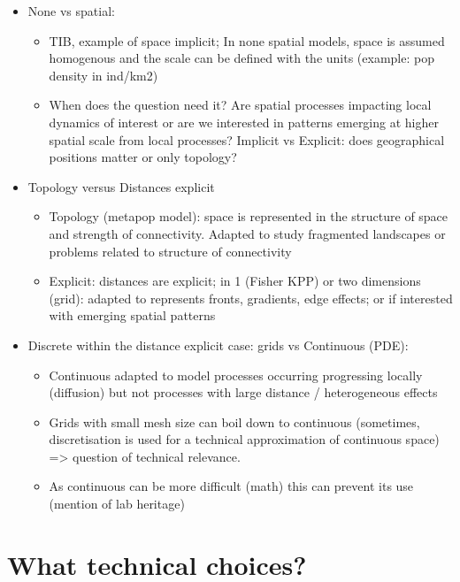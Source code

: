 \documentclass[
]{book}
\providecommand{\tightlist}{%
  \setlength{\itemsep}{0pt}\setlength{\parskip}{0pt}}
\theoremstyle{definition}
\theoremstyle{definition}
\theoremstyle{definition}
\theoremstyle{definition}
\theoremstyle{remark}
\begin{document}
\begin{itemize}
\tightlist
\item
  None vs spatial:

  \begin{itemize}
  \tightlist
  \item
    TIB, example of space implicit; In none spatial models, space is assumed homogenous and the scale can be defined with the units (example: pop density in ind/km2)
  \item
    When does the question need it? Are spatial processes impacting local dynamics of interest or are we interested in patterns emerging at higher spatial scale from local processes? Implicit vs Explicit: does geographical positions matter or only topology?
  \end{itemize}
\item
  Topology versus Distances explicit

  \begin{itemize}
  \tightlist
  \item
    Topology (metapop model): space is represented in the structure of space and strength of connectivity. Adapted to study fragmented landscapes or problems related to structure of connectivity
  \item
    Explicit: distances are explicit; in 1 (Fisher KPP) or two dimensions (grid): adapted to represents fronts, gradients, edge effects; or if interested with emerging spatial patterns
  \end{itemize}
\item
  Discrete within the distance explicit case: grids vs Continuous (PDE):

  \begin{itemize}
  \tightlist
  \item
    Continuous adapted to model processes occurring progressing locally (diffusion) but not processes with large distance / heterogeneous effects
  \item
    Grids with small mesh size can boil down to continuous (sometimes, discretisation is used for a technical approximation of continuous space) =\textgreater{} question of technical relevance.
  \item
    As continuous can be more difficult (math) this can prevent its use (mention of lab heritage)
  \end{itemize}
\end{itemize}

\section{What technical choices?}\label{what-technical-choices}
\end{document}
